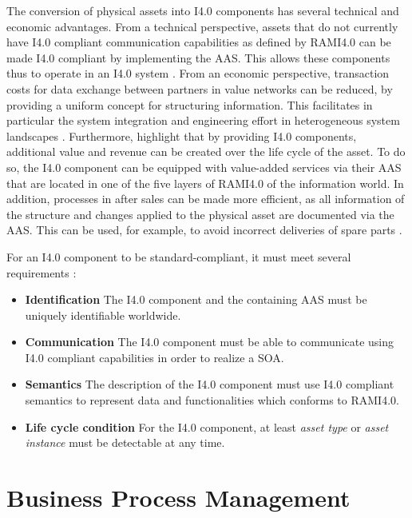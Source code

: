 The conversion of physical assets into \ac{I4.0} components has several technical and economic advantages. From a technical perspective, assets that do not currently have \ac{I4.0} compliant communication capabilities as defined by \ac{RAMI4.0} can be made \ac{I4.0} compliant by implementing the \ac{AAS}. This allows these components thus to operate in an \ac{I4.0} system \cite[p. 1005]{Birtel2019FutureFit:Approach}. From an economic perspective, transaction costs for data exchange between partners in value networks can be reduced, by providing a uniform concept for structuring information. This facilitates in particular the system integration and engineering effort in heterogeneous system landscapes \cite[p. 324]{Lachenmaier2019entwicklung}. Furthermore,  \citet[p. 325]{Lachenmaier2019entwicklung} highlight that by providing \ac{I4.0} components, additional value and revenue can be created over the life cycle of the asset. To do so, the \ac{I4.0} component can be equipped with value-added services via their \ac{AAS} that are located in one of the five layers of \ac{RAMI4.0} of the information world. In addition, processes in after sales can be made more efficient, as all information of the structure and changes applied to the physical asset are documented via the \ac{AAS}. This can be used, for example, to avoid incorrect deliveries of spare parts \citet[p. 329]{Lachenmaier2019entwicklung}.

For an \ac{I4.0} component to be standard-compliant, it must meet several requirements \cite[p. 1]{Koschnick2015Die4.0-Komponente}:
\begin{itemize}
    \item \textbf{Identification} The \ac{I4.0} component and the containing \ac{AAS} must be uniquely identifiable worldwide.
    \item \textbf{Communication} The \ac{I4.0} component must be able to communicate using \ac{I4.0} compliant capabilities in order to realize a \ac{SOA}.
    \item \textbf{Semantics} The description of the \ac{I4.0} component must use \ac{I4.0} compliant semantics to represent data and functionalities which conforms to \ac{RAMI4.0}.
    \item \textbf{Life cycle condition} For the \ac{I4.0} component, at least \textit{asset type} or \textit{asset instance} must be detectable at any time.
\end{itemize}

\section{Business Process Management}











